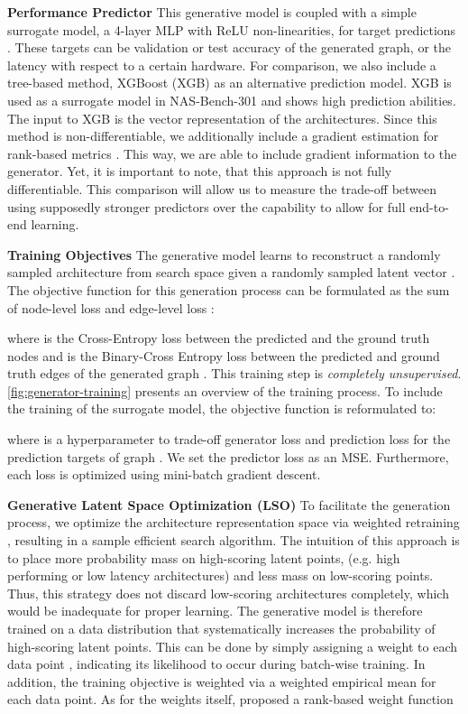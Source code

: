 \documentclass[runningheads]{llncs}
\begin{document}
\noindent \textbf{Performance Predictor}
This generative model is coupled with a simple surrogate model, a 4-layer MLP with ReLU non-linearities, for target predictions . These targets can be validation or test accuracy of the generated graph, or the latency with respect to a certain hardware. 
For comparison, we also include a tree-based method, XGBoost (XGB) \cite{XGB} as an alternative prediction model. XGB\cite{XGB} is used as a surrogate model in NAS-Bench-301 \cite{2020NB301} and shows high prediction abilities. The input to XGB is the vector representation of the architectures. Since this method is non-differentiable, we additionally include a gradient estimation for rank-based metrics \cite{RankbasedGradients}. This way, we are able to include gradient information to the generator. Yet, it is important to note, that this approach is not fully differentiable. This comparison will allow us to measure the trade-off between using supposedly stronger predictors over the capability to allow for full end-to-end learning.


\noindent \textbf{Training Objectives}
The generative model  learns to reconstruct a randomly sampled architecture  from search space  given a randomly sampled latent vector .
The objective function for this generation process can be formulated as the sum of node-level loss  and edge-level loss :

where  is the Cross-Entropy loss between the predicted and the ground truth nodes and  is the Binary-Cross Entropy loss between the predicted and ground truth edges of the generated graph .
This training step is \emph{completely unsupervised}.
\autoref{fig:generator-training} presents an overview of the training process.
To include the training of the surrogate model, the objective function is reformulated to:

where  is a hyperparameter to trade-off generator loss  and prediction loss  for the prediction targets  of graph .
We set the predictor loss as an MSE. Furthermore, each loss is optimized using mini-batch gradient descent.

\noindent \textbf{Generative Latent Space Optimization (LSO)}
To facilitate the generation process, we optimize the architecture representation space via weighted retraining \cite{2020Reweighting}, resulting in a sample efficient search algorithm.
The intuition of this approach is to place more probability mass on high-scoring latent points, (e.g. high performing or low latency architectures) and less mass on low-scoring points.
Thus, this strategy does not discard low-scoring architectures completely, which would be inadequate for proper learning.
The generative model is therefore trained on a data distribution that systematically increases the probability of high-scoring latent points.
This can be done by simply assigning a weight  to each data point , indicating its likelihood to occur during batch-wise training.
In addition, the training objective is weighted via a weighted empirical mean
 for each data point.
As for the weights itself,  \cite{2020Reweighting} proposed a rank-based weight function
\end{document}

